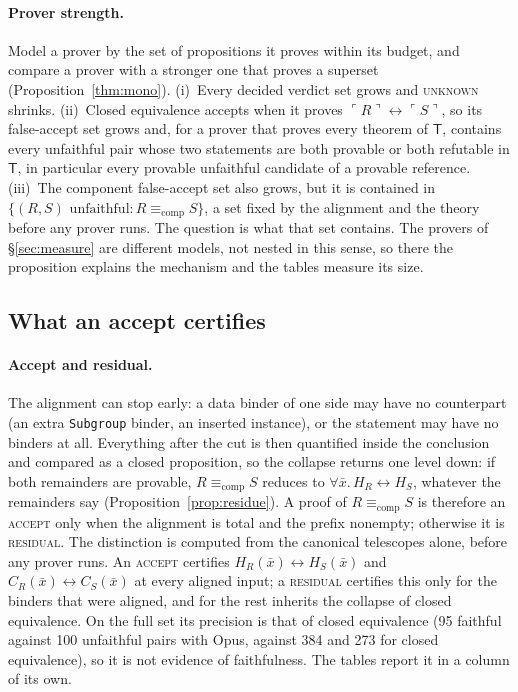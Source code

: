 \documentclass[10pt]{article}
\theoremstyle{definition}
\newcommand{\T}{\mathsf{T}}
\newcommand{\Cl}[1]{\ulcorner #1 \urcorner}
\newcommand{\Ecomp}{\mathrel{\equiv_{\mathrm{comp}}}}
\newcommand{\V}[1]{\textsc{#1}}
\begin{document}
\paragraph{Prover strength.} Model a prover by the set of propositions it proves within its
budget, and compare a prover with a stronger one that proves a superset
(Proposition~\ref{thm:mono}). (i)~Every decided verdict set grows and \V{unknown} shrinks.
(ii)~Closed equivalence accepts when it proves $\Cl R\leftrightarrow\Cl S$, so its false-accept
set grows and, for a prover that proves every theorem of $\T$, contains every unfaithful pair
whose two statements are both provable or both refutable in $\T$, in particular every provable
unfaithful candidate of a provable reference. (iii)~The component false-accept set also grows, but it is contained in
$\{(R,S)\text{ unfaithful}: R\Ecomp S\}$, a set fixed by the alignment and the theory before any
prover runs. The question is what that set contains. The provers of \S\ref{sec:measure} are
different models, not nested in this sense, so there the proposition explains the mechanism and the
tables measure its size.

\subsection{What an accept certifies}\label{sec:survive}

\paragraph{Accept and residual.} The alignment can stop early: a data binder of one
side may have no counterpart (an extra \texttt{Subgroup} binder, an inserted instance), or the
statement may have no binders at all. Everything after the cut is then quantified inside the
conclusion and compared as a closed proposition, so the collapse returns one level down: if both
remainders are provable, $R\Ecomp S$ reduces to $\forall\bar x.\,H_R\leftrightarrow H_S$, whatever the
remainders say (Proposition~\ref{prop:residue}). A proof of $R\Ecomp S$ is therefore an
\V{accept} only when the alignment is total and the prefix nonempty; otherwise it is
\V{residual}. The distinction is computed from the canonical telescopes alone, before any prover
runs. An \V{accept} certifies $H_R(\bar x)\leftrightarrow H_S(\bar x)$ and
$C_R(\bar x)\leftrightarrow C_S(\bar x)$ at every aligned input; a \V{residual} certifies this
only for the binders that were aligned, and for the rest inherits the collapse of closed
equivalence. On the full set its precision is that of closed equivalence (95 faithful against 100
unfaithful pairs with Opus, against 384 and 273 for closed equivalence), so it is not evidence of
faithfulness. The tables report it in a column of its own.
\end{document}
